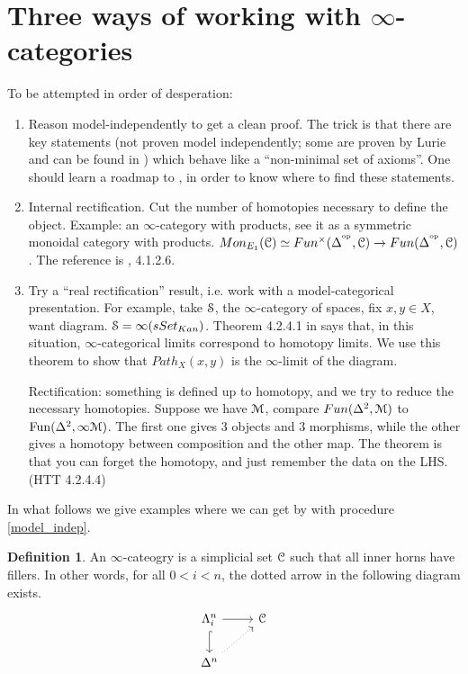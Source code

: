 \documentclass[10pt,a4paper,reqno,oneside]{book} %
\theoremstyle{plain}
\theoremstyle{definition}
\newtheorem{defin}[thm]{Definition}
\theoremstyle{remark}
\numberwithin{equation}{section}
\begin{document}
\section{Three ways of working with $\infty$-categories}
To be attempted in order of desperation:
\begin{enumerate}
\item \label{model_indep} 
Reason model-independently to get a clean proof. The trick is that there are key statements (not proven model
independently; some are proven by Lurie and can be found in \cite{HTT}) which behave like a ``non-minimal set of axioms''.
One should learn a roadmap to \cite{HTT}, in order to know where to find these statements.

\item Internal rectification. Cut the number of homotopies necessary to define the object. Example: an $\infty$-category with
products, see it as a symmetric monoidal category with products. $Mon_{E_1}(\mathcal C) \simeq Fun^{\times}(\Delta^{^\mathrm{op}}, \mathcal C)
\to Fun(\Delta^{^\mathrm{op}}, \mathcal C)$.
The reference is \cite{Lurie_Higher_algebra}, 4.1.2.6. 

\item \label{item:real_rectification}
Try a ``real rectification'' result, i.e. work with a model-categorical presentation. For example, take $\mathcal S$,
the $\infty$-category
of spaces, fix $x,y \in X$, want diagram. $\mathcal S = \infty(sSet_{Kan})$. Theorem 4.2.4.1 in \cite{HTT} says that, in this situation, 
$\infty$-categorical limits correspond to homotopy limits. We use this theorem to show that $Path_X(x,y)$ is the $\infty$-limit
of the diagram.

Rectification: something is defined up to homotopy, and we try to reduce the necessary homotopies. Suppose we have
$\mathcal M$, compare $Fun(\Delta^2,\mathcal M)$ to $\operatorname{Fun}(\Delta^2, \infty \mathcal M)$. The first one gives 3 objects and 3 morphisms, while
the other gives a homotopy between composition and the other map. The theorem is that you can forget the homotopy, and
just remember the data on the LHS. (HTT 4.2.4.4)
\end{enumerate}

In what follows we give examples where we can get by with procedure \ref{model_indep}. 

\begin{defin}
An $\infty$-cateogry is a simplicial set $\mathcal C$ such that all inner horns have fillers. In other words, for all $0<i<n$,
the dotted arrow in the following diagram exists.
\[
\begin{tikzcd}
\Lambda^{n}_{i}\arrow[hook]{d}\arrow{r} & \cC \\
\Delta^n\arrow[dotted]{ur} & 
\end{tikzcd}
\]
\end{defin}
\end{document}
